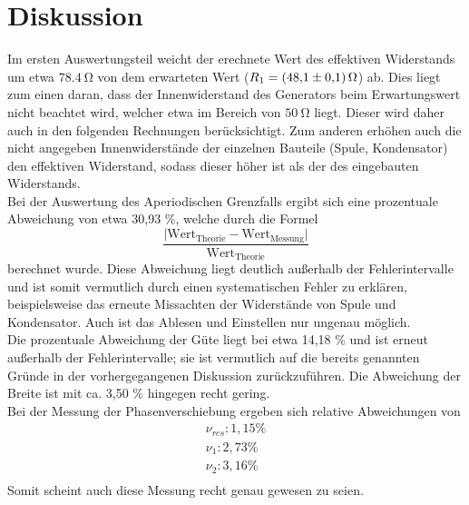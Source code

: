\section{Diskussion}
Im ersten Auswertungsteil weicht der erechnete Wert des effektiven Widerstands um
etwa $\SI{78.4}{\ohm}$ von dem erwarteten Wert ($R_1 = \SI{48.1 (1)}{\ohm}$) ab.
Dies liegt zum einen daran, dass der Innenwiderstand des Generators beim Erwartungswert nicht beachtet
wird, welcher etwa im Bereich von $ \SI{50}{\ohm}$ liegt.
Dieser wird daher auch in den folgenden Rechnungen berücksichtigt. Zum anderen
erhöhen auch die nicht angegeben Innenwiderstände der einzelnen Bauteile (Spule, Kondensator)
den effektiven Widerstand, sodass dieser höher ist als der des eingebauten Widerstands.
\\
\noindent Bei der Auswertung des Aperiodischen Grenzfalls ergibt sich eine prozentuale
Abweichung von etwa 30,93 \%, welche durch die Formel
\begin{equation*}
  \frac{\lvert \text{Wert}_{\text{Theorie}}-\text{Wert}_{\text{Messung}}\rvert}{\text{Wert}_{\text{Theorie}}}
\end{equation*}
berechnet wurde. Diese Abweichung liegt deutlich außerhalb der Fehlerintervalle
und ist somit vermutlich durch einen systematischen Fehler zu erklären, beispielsweise
das erneute Missachten der Widerstände von Spule und Kondensator. Auch ist das
Ablesen und Einstellen nur ungenau möglich.
\\
\noindent Die prozentuale Abweichung der Güte liegt bei etwa 14,18 \% und ist erneut außerhalb
der Fehlerintervalle; sie ist vermutlich auf die bereits genannten Gründe in der vorhergegangenen
Diskussion zurückzuführen.
Die Abweichung der Breite ist mit ca. 3,50 \% hingegen recht gering. \\
\noindent Bei der Messung der Phasenverschiebung ergeben sich relative Abweichungen von
\begin{align*}
  \nu_{res} : 1,15 \% \\
  \nu_1 : 2,73 \% \\
  \nu_2 : 3,16 \% \\
\end{align*}
Somit scheint auch diese Messung recht genau gewesen zu seien.
